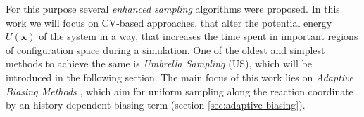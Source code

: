 For this purpose several \textit{enhanced sampling} algorithms were proposed.\autocite{jiang2010free, sugita1999replica,den2000thermodynamic, kastner2011umbrella, ciccotti2005blue, barducci2008well}
In this work we will focus on CV-based approaches, that alter the potential energy $U(\textbf{x})$ of the system in a way, that increases the time spent in important regions of configuration space during a simulation. One of the oldest and simplest methods to achieve the same is \textit{Umbrella Sampling} (US)\autocite{kastner2011umbrella}, which will be introduced in the following section.
The main focus of this work lies on \textit{Adaptive Biasing Methods} \autocite{barducci2011metadynamics,comer2015adaptive, lesage2017smoothed}, which aim for uniform sampling along the reaction coordinate by an history dependent biasing term (section \ref{sec:adaptive biasing}).
\newpage

